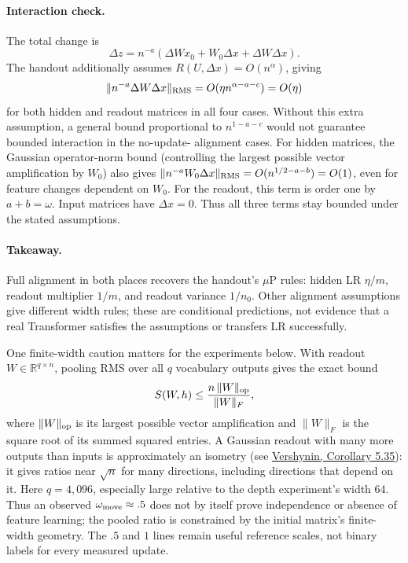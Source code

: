 \documentclass{article}
\begin{document}
\paragraph{Interaction check.} The total change is
\[
\Delta z=n^{-a}(\Delta W x_0+W_0\Delta x+\Delta W\Delta x).
\]
The handout additionally assumes $R(U,\Delta x)=O(n^\alpha)$, giving
\[
\|n^{-a}\Delta W\Delta x\|_{\rm RMS}
=O(\eta n^{\alpha-a-c})=O(\eta)
\]
for both hidden and readout matrices in all four cases.
Without this extra assumption, a general bound proportional to
$n^{1-a-c}$ would not guarantee bounded interaction in the no-update-
alignment cases. For hidden matrices, the Gaussian operator-norm bound
(controlling the largest possible vector amplification by $W_0$)
also gives $\|n^{-a}W_0\Delta x\|_{\rm RMS}=O(n^{1/2-a-b})=O(1)$,
even for feature changes dependent on $W_0$. For the readout, this term
is order one by $a+b=\omega$. Input matrices have $\Delta x=0$.
Thus all three terms stay bounded under the stated assumptions.

\paragraph{Takeaway.} Full alignment in both places recovers the
handout's $\mu$P rules: hidden LR $\eta/m$, readout multiplier $1/m$,
and readout variance $1/n_0$. Other alignment assumptions give different
width rules; these are conditional predictions, not evidence that a real
Transformer satisfies the assumptions or transfers LR successfully.

One finite-width caution matters for the experiments below. With readout
$W\in\mathbb R^{q\times n}$, pooling RMS over all $q$ vocabulary outputs
gives the exact bound
\[
 S(W,h)\le\frac{n\,\|W\|_{\rm op}}{\|W\|_F},
\]
where $\|W\|_{\rm op}$ is its largest possible vector amplification and
$\|W\|_F$ is the square root of its summed squared entries. A Gaussian
readout with many more outputs than inputs is approximately an isometry
(see \href{https://arxiv.org/abs/1011.3027}{Vershynin, Corollary 5.35}):
it gives ratios near $\sqrt n$ for many directions, including directions
that depend on it. Here $q=4{,}096$, especially large relative to the
depth experiment's width 64. Thus an observed $\omega_{\rm move}\approx.5$
does not by itself prove independence or absence of feature learning;
the pooled ratio is constrained by the initial matrix's finite-width
geometry. The $.5$ and $1$ lines remain useful reference scales, not
binary labels for every measured update.
\end{document}
